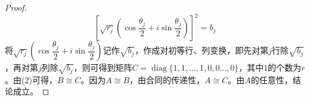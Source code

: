 \begin{proof}
	\begin{equation*}
		\left[\sqrt{r_j}\left(\cos\frac{\theta_j}{2}+i\sin\frac{\theta_j}{2}\right)\right]^2=b_j
	\end{equation*}
	将$\sqrt{r_j}\left(\cos\dfrac{\theta_j}{2}+i\sin\dfrac{\theta_j}{2}\right)$记作$\sqrt{b_j}$，作成对初等行、列变换，即先对第$j$行除$\sqrt{b_j}$，再对第$j$列除$\sqrt{b_j}$，则可得到矩阵$C=\operatorname{diag}\{1,1,\dots,1,0,0\dots,0\}$，其中$1$的个数为$r$。由(2)可得，$B\cong C$。因为$A\cong B$，由合同的传递性，$A\cong C$。由$A$的任意性，结论成立。
\end{proof}
